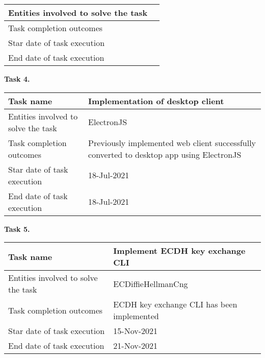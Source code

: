 \begin{description}
\begin{tabular}{|p{}|p{}|}
        \hline
        Entities involved to solve the task &                                     \\
        \hline
        Task completion outcomes            &                                     \\
        \hline
        Star date of task execution         &                                     \\
        \hline
        End date of task execution          &                                     \\
        \hline
    \end{tabular}
    \item \hspace*{8mm}\textbf{Task 4.}\\
    \begin{tabular}{|p{}|p{}|}
        \hline
        Task name                           & Implementation of desktop client                                                         \\
        \hline
        Entities involved to solve the task & ElectronJS                                                                               \\
        \hline
        Task completion outcomes            & Previously implemented web client successfully converted to desktop app using ElectronJS \\
        \hline
        Star date of task execution         & 18-Jul-2021                                                                              \\
        \hline
        End date of task execution          & 18-Jul-2021                                                                              \\
        \hline
    \end{tabular}
    \item \hspace*{8mm}\textbf{Task 5.}\\
    \begin{tabular}{|p{}|p{}|}
        \hline
        Task name                           & Implement ECDH key exchange CLI            \\
        \hline
        Entities involved to solve the task & ECDiffieHellmanCng                         \\
        \hline
        Task completion outcomes            & ECDH key exchange CLI has been implemented \\
        \hline
        Star date of task execution         & 15-Nov-2021                                \\
        \hline
        End date of task execution          & 21-Nov-2021                                \\
        \hline
    \end{tabular}
\end{description}